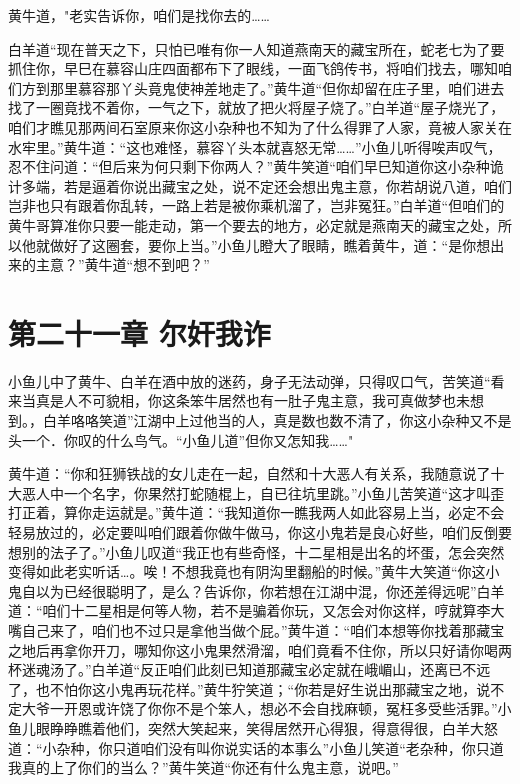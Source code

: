 \documentclass[12pt,oneside]{book}
\begin{document}
黄牛道，"老实告诉你，咱们是找你去的\ldots\ldots{}

白羊道``现在普天之下，只怕已唯有你一人知道燕南天的藏宝所在，蛇老七为了要抓住你，早巳在慕容山庄四面都布下了眼线，一面飞鸽传书，将咱们找去，哪知咱们方到那里慕容那丫头竟鬼使神差地走了。''黄牛道``但你却留在庄子里，咱们进去找了一圈竟找不着你，一气之下，就放了把火将屋子烧了。''白羊道``屋子烧光了，咱们才瞧见那两间石室原来你这小杂种也不知为了什么得罪了人家，竟被人家关在水牢里。''黄牛道：``这也难怪，慕容丫头本就喜怒无常\ldots\ldots{}''小鱼儿听得唉声叹气，忍不住问道：``但后来为何只剩下你两人？''黄牛笑道``咱们早巳知道你这小杂种诡计多端，若是逼着你说出藏宝之处，说不定还会想出鬼主意，你若胡说八道，咱们岂非也只有跟着你乱转，一路上若是被你乘机溜了，岂非冤狂。''白羊道``但咱们的黄牛哥算准你只要一能走动，第一个要去的地方，必定就是燕南天的藏宝之处，所以他就做好了这圈套，要你上当。''小鱼儿瞪大了眼睛，瞧着黄牛，道：``是你想出来的主意？''黄牛道``想不到吧？''

\hypertarget{ux7b2cux4e8cux5341ux4e00ux7ae0-ux5c14ux5978ux6211ux8bc8}{%
\chapter{第二十一章
尔奸我诈}\label{ux7b2cux4e8cux5341ux4e00ux7ae0-ux5c14ux5978ux6211ux8bc8}}

小鱼儿中了黄牛、白羊在酒中放的迷药，身子无法动弹，只得叹口气，苦笑道``看来当真是人不可貌相，你这条笨牛居然也有一肚子鬼主意，我可真做梦也未想到。，白羊咯咯笑道''江湖中上过他当的人，真是数也数不清了，你这小杂种又不是头一个．你叹的什么鸟气。``小鱼儿道''但你又怎知我\ldots\ldots"

黄牛道：``你和狂狮铁战的女儿走在一起，自然和十大恶人有关系，我随意说了十大恶人中一个名字，你果然打蛇随棍上，自已往坑里跳。''小鱼儿苦笑道``这才叫歪打正着，算你走运就是。''黄牛道：``我知道你一瞧我两人如此容易上当，必定不会轻易放过的，必定要叫咱们跟着你做牛做马，你这小鬼若是良心好些，咱们反倒要想别的法子了。''小鱼儿叹道``我正也有些奇怪，十二星相是出名的坏蛋，怎会突然变得如此老实听话\ldots。唉！不想我竟也有阴沟里翻船的时候。''黄牛大笑道``你这小鬼自以为已经很聪明了，是么？告诉你，你若想在江湖中混，你还差得远呢''白羊道：``咱们十二星相是何等人物，若不是骗着你玩，又怎会对你这样，哼就算李大嘴自己来了，咱们也不过只是拿他当做个屁。''黄牛道：``咱们本想等你找着那藏宝之地后再拿你开刀，哪知你这小鬼果然滑溜，咱们竟看不住你，所以只好请你喝两杯迷魂汤了。''白羊道``反正咱们此刻已知道那藏宝必定就在峨嵋山，还离已不远了，也不怕你这小鬼再玩花样。''黄牛狞笑道；``你若是好生说出那藏宝之地，说不定大爷一开恩或许饶了你你不是个笨人，想必不会自找麻顿，冤枉多受些活罪。''小鱼儿眼睁睁瞧着他们，突然大笑起来，笑得居然开心得狠，得意得很，白羊大怒道：``小杂种，你只道咱们没有叫你说实话的本事么''小鱼儿笑道``老杂种，你只道我真的上了你们的当么？''黄牛笑道``你还有什么鬼主意，说吧。''
\end{document}
